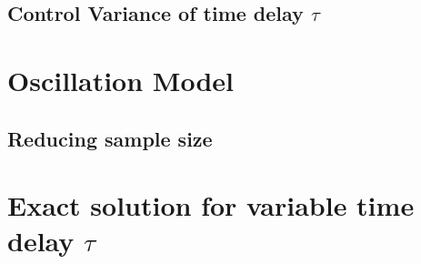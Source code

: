 \documentclass[a4paper,10pt]{article}
\begin{document}
\subsection{Control Variance of time delay $\tau$}

\section{Oscillation Model}

\subsection{Reducing sample size}

\section{Exact solution for variable time delay $\tau$}



\end{document}
